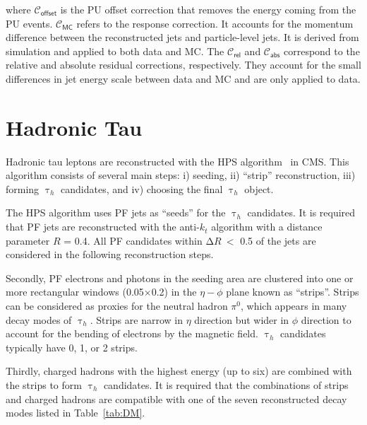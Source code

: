where $\mathcal{C}_{\textsf{offset}}$ is the \ac{PU} offset correction that removes the energy coming from the \ac{PU} events. $\mathcal{C}_{\textsf{MC}}$ refers to the response correction. It accounts for the momentum difference between the reconstructed jets and particle-level jets. It is derived from simulation and applied to both data and \ac{MC}. The $\mathcal{C}_{\textsf{rel}}$ and $\mathcal{C}_{\textsf{abs}}$ correspond to the relative and absolute residual corrections, respectively. They account for the small differences in jet energy scale between data and \ac{MC} and are only applied to data.

\section{Hadronic Tau}
\label{sec:Tau}

Hadronic tau leptons are reconstructed with the \ac{HPS} algorithm~\cite{CMS:2011eio} in \ac{CMS}. This algorithm consists of several main steps: i) seeding, ii) ``strip'' reconstruction, iii) forming $\uptau_{h}$ candidates, and iv) choosing the final $\uptau_{h}$ object.

The \ac{HPS} algorithm uses \ac{PF} jets as ``seeds'' for the $\uptau_h$ candidates. It is required that \ac{PF} jets are reconstructed with the anti-$k_t$ algorithm with a distance parameter $R$ = 0.4. All \ac{PF} candidates within $\mathrm{\Delta}R~<$ 0.5 of the jets are considered in the following reconstruction steps.

Secondly, \ac{PF} electrons and photons in the seeding area are clustered into one or more rectangular windows (0.05$\times$0.2) in the $\eta-\phi$ plane known as ``strips''. Strips can be considered as proxies for the neutral hadron $\pi^0$, which appears in many decay modes of $\uptau_h$. Strips are narrow in $\eta$ direction but wider in $\phi$ direction to account for the bending of electrons by the magnetic field. $\uptau_h$ candidates typically have 0, 1, or 2 strips. 

Thirdly, charged hadrons with the highest energy (up to six) are combined with the strips to form $\uptau_h$ candidates. It is required that the combinations of strips and charged hadrons are compatible with one of the seven reconstructed decay modes listed in Table~\ref{tab:DM}.

